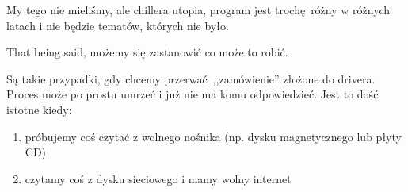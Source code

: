 My tego nie mieliśmy, ale chillera utopia, program jest trochę różny w różnych latach i nie będzie tematów, których nie było.

That being said, możemy się zastanowić co może to robić.

Są takie przypadki, gdy chcemy przerwać ,,zamówienie'' złożone do drivera. Proces może po prostu umrzeć i już nie ma komu odpowiedzieć.
Jest to dość istotne kiedy:
\begin{enumerate}
	\item próbujemy coś czytać z wolnego nośnika (np. dysku magnetycznego lub płyty CD)
	\item czytamy coś z dysku sieciowego i mamy wolny internet
\end{enumerate}